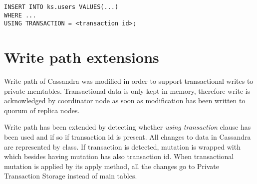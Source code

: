 






\begin{lstlisting}[style=outcode,label={lst:insertUsingTx},caption={Insert statement with using transactional clause}]
INSERT INTO ks.users VALUES(...) 
WHERE ...
USING TRANSACTION = <transaction id>;
\end{lstlisting}




\section{Write path extensions}
Write path of Cassandra \cite{CassandraWritePath} was modified in order to support transactional writes to private memtables. 
Transactional data is only kept in-memory, therefore write is acknowledged by coordinator node as soon as modification has been written to quorum of replica nodes.


Write path has been extended by detecting whether \emph{using transaction} clause has been used and if so if transaction id is present. All changes to data in Cassandra are represented by  class. If transaction is detected, mutation is wrapped with  which besides having mutation has also transaction id.
When transactional mutation is applied by its apply method, all the changes go to Private Transaction Storage instead of main tables.


